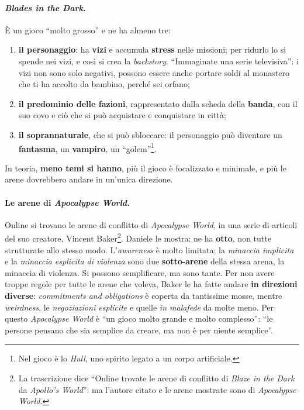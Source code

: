 \paragraph{\emph{Blades in the Dark}.} È un gioco ``molto grosso'' e ne ha almeno tre:
\begin{enumerate}
  \item \textbf{il personaggio}: ha \textbf{vizi} e accumula \textbf{stress} nelle missioni; per
        ridurlo lo si spende nei vizi, e così si crea la \emph{backstory}. ``Immaginate una serie
        televisiva'': i vizi non sono solo negativi, possono essere anche portare soldi al monastero
        che ti ha accolto da bambino, perché sei orfano;
  \item \textbf{il predominio delle fazioni}, rappresentato dalla scheda della \textbf{banda}, con il
        suo covo e ciò che si può acquistare e conquistare in città;
  \item \textbf{il soprannaturale}, che si può sbloccare: il personaggio può diventare un
        \textbf{fantasma}, un \textbf{vampiro}, un ``golem''\footnote{Nel gioco è lo \emph{Hull}, uno
        spirito legato a un corpo artificiale.}.
\end{enumerate}
In teoria, \textbf{meno temi si hanno}, più il gioco è focalizzato e minimale, e più le arene
dovrebbero andare in un'unica direzione.

\paragraph{Le arene di \emph{Apocalypse World}.} Online si trovano le arene di conflitto di
\emph{Apocalypse World}, in una serie di articoli del suo creatore, Vincent
Baker\footnote{La trascrizione dice ``Online trovate le arene di conflitto di \emph{Blaze in the
Dark} da \emph{Apollo's World}'': ma l'autore citato e le arene mostrate sono di \emph{Apocalypse
World}.}. Daniele le mostra: ne ha \textbf{otto}, non tutte strutturate allo stesso modo.
L'\emph{awareness} è molto limitata; la \emph{minaccia implicita} e la \emph{minaccia esplicita di
violenza} sono due \textbf{sotto-arene} della stessa arena, la minaccia di violenza. Si possono
semplificare, ma sono tante. Per non avere troppe regole per tutte le arene che voleva, Baker le ha
fatte andare \textbf{in direzioni diverse}: \emph{commitments and obligations} è coperta da tantissime
mosse, mentre \emph{weirdness}, le \emph{negoziazioni esplicite} e quelle \emph{in malafede} da molte
meno. Per questo \emph{Apocalypse World} è ``un gioco molto grande e molto complesso'': ``le persone
pensano che sia semplice da creare, ma non è per niente semplice''.

